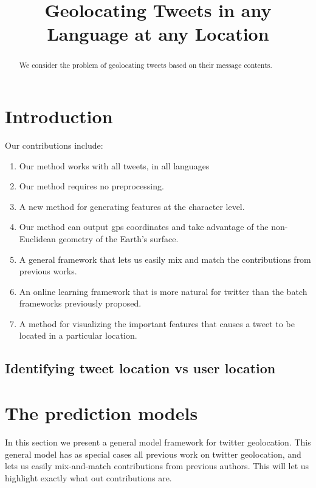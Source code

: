 \documentclass{article}
\title{Geolocating Tweets in any Language at any Location}
\author{\fixme{authors}}
\begin{document}
\maketitle

\begin{abstract}
    We consider the problem of geolocating tweets based on their message contents.
\end{abstract}

\section{Introduction}

Our contributions include:
\begin{enumerate}
    \item
        Our method works with all tweets, in all languages
    \item
        Our method requires no preprocessing.
    \item
        A new method for generating features at the character level.
    \item
        Our method can output gps coordinates and take advantage of the non-Euclidean geometry of the Earth's surface.
    \item
        A general framework that lets us easily mix and match the contributions from previous works.
    \item
        An online learning framework that is more natural for twitter than the batch frameworks previously proposed.
    \item
        A method for visualizing the important features that causes a tweet to be located in a particular location.
\end{enumerate}

\subsection{Identifying tweet location vs user location}

\section{The prediction models}
In this section we present a general model framework for twitter geolocation.
This general model has as special cases all previous work on twitter geolocation,
and lets us easily mix-and-match contributions from previous authors.
This will let us highlight exactly what out contributions are.
\end{document}
